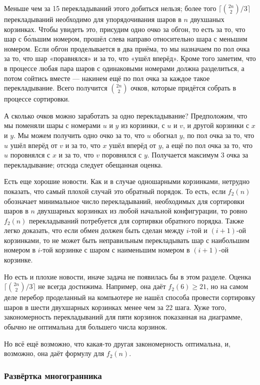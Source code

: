 Меньше чем за 15 перекладываний этого добиться нельзя; более того $\lceil\binom{2n}{2}/3\rceil$ перекладываний необходимо для упорядочивания шаров в $n$ двухшаных корзинках.
Чтобы увидеть это, присудим одно очко за обгон, то есть за то, что шар с б\'{о}льшим номером, прошёл слева направо относительно шара с меньшим номером.
Если обгон проделывается в два приёма, то мы назначаем по пол очка за то, что шар «поравнялся» и за то, что «ушёл вперёд».
Кроме того заметим, что в процессе любая пара шаров с одинаковыми номерами должна разделиться, а потом сойтись вместе --- накинем ещё по пол очка за каждое такое перекладывание. 
Всего получится $\binom{2n}2$ очков, которые придётся собрать в процессе сортировки.

А сколько очков можно заработать за одно перекладывание?
Предположим, что мы поменяли шары с номерами $u$ и $y$ из корзинки, с $u$ и $v$, и другой корзинки с $x$ и $y$.
Мы можем получить одно очко за то, что $u$ обогнал $y$,
по пол очка за то, что $u$ ушёл вперёд от $v$
и за то, что $x$ ушёл вперёд от $y$,
а ещё по пол очка за то, что $u$ поровнялся с $x$ 
и за то, что $v$ поровнялся с $y$.
Получается максимум 3 очка за перекладывание;
отсюда следует обещанная оценка.


Есть еще хорошие новости.
Как и в случае одношарными корзинками, нетрудно показать, что самый плохой случай это обратный порядок.
То есть, если $f_2(n)$ обозначает минимальное число перекладываний, необходимых для сортировки шаров в $n$ двухшарных корзинках из любой начальной конфигурации, то ровно $f_2(n)$ перекладываний потребуется для сортирвки обратного порядка.
Также легко доказать, что если обмен должен быть сделан между $i$-той и $(i+1)$-ой корзинками, то не может быть неправильным перекладывать шар с наибольшим номером в $i$-той корзинке с шаром с наименьшим номером в $(i+1)$-ой корзинке.

Но есть и плохие новости, иначе задача не появилась бы в этом разделе.
Оценка $\lceil\binom{2n}{2}/3\rceil$ не всегда достижима.
Например, она даёт $f_2(6)\ge 21$, но на самом деле перебор проделанный на компьютере не нашёл способа провести сортировку шаров в шести двухшарных корзинках менее чем за 22 шага.
Хуже того, закономерность перекладываний для пяти корзинок показанная на диаграмме, обычно не оптимальна для большего числа корзинок.

Но всё ещё возможно, что какая-то другая закономерность оптимальна, и, возможно, она даёт формулу для $f_2(n)$.

\subsubsection*{Развёртка многогранника}

